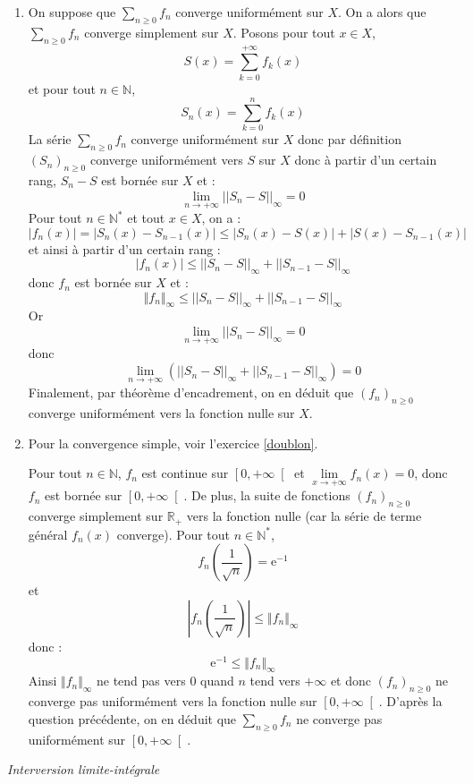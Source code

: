 \documentclass[a4paper,10pt]{report}
\newcommand{\Sum}[2]{\ensuremath{\textstyle{\sum\limits_{#1}^{#2}}}}
\begin{document}
\corr 
\begin{enumerate}
\item On suppose que $\Sum{n\geq 0}{} f_n$ converge uniformément sur $X$. On a alors que $\Sum{n\geq 0}{} f_n$ converge simplement sur $X$. Posons pour tout $x \in X$,
$$S(x)=\displaystyle\sum\limits_{k=0}^{+\infty}f_k(x)$$
et pour tout $n\in\mathbb{N}$, 
$$S_n(x)=\displaystyle\sum\limits_{k=0}^{n}f_k(x)$$
La série $\Sum{n\geq 0}{} f_n$ converge uniformément sur $X$ donc par définition $(S_n)_{n \geq 0}$ converge uniformément vers $S$ sur $X$ donc à partir d'un certain rang, $S_n-S$ est bornée sur $X$ et :
$$\lim\limits_{n\to+\infty}^{}||S_n-S||_{\infty}=0$$ 
Pour tout $n \in \mathbb{N}^*$ et tout $x \in X$, on a :
$$|f_n(x)|=|S_n(x)-S_{n-1}(x)|\leq |S_n(x)-S(x)|+|S(x)-S_{n-1}(x)|$$
et ainsi à partir d'un certain rang :
$$|f_n(x)|\leq ||S_n-S||_{\infty} +||S_{n-1}-S||_{\infty} $$ 
donc $f_n$ est bornée sur $X$ et : 
$$ \Vert f_n \Vert_{\infty} \leq ||S_n-S||_{\infty} +||S_{n-1}-S||_{\infty} $$ 
Or  
$$\lim\limits_{n\to+\infty}^{}||S_n-S||_{\infty}=0$$ 
donc   
$$\lim\limits_{n\to+\infty}^{}\left( ||S_n-S||_{\infty}+||S_{n-1}-S||_{\infty}\right) =0$$
Finalement, par théorème d'encadrement, on en déduit que  $(f_n)_{n \geq 0}$ converge uniformément vers la fonction nulle sur $X$.
\item Pour la convergence simple, voir l'exercice \ref{doublon}.

\medskip

\noindent Pour tout $n\in\mathbb{N}$, $f_n$ est continue sur  $\left[0,+\infty \right[$ et  $\lim\limits_{x\to +\infty}^{}f_n(x)=0$, donc $f_n$ est bornée sur $\left[0,+\infty \right[$. De plus, la suite de fonctions $(f_n)_{n \geq 0}$ converge simplement sur $\mathbb{R}_+$ vers la fonction nulle (car la série de terme général $f_n(x)$ converge). Pour tout $n\in\mathbb{N}^*$, 
$$f_n\left( \dfrac{1}{\sqrt{n}}\right) =\mathrm{e}^{-1}$$
et
$$\left\vert f_n\left( \dfrac{1}{\sqrt{n}}\right) \right\vert \leq \Vert f_n \Vert_{\infty}$$
donc :
$$ \mathrm{e}^{-1} \leq \Vert f_n \Vert_{\infty}$$
Ainsi $\Vert f_n \Vert_{\infty}$ ne tend pas vers $0$ quand $n$ tend vers $+ \infty$ et donc $(f_n)_{n \geq 0}$ ne converge pas uniformément vers la fonction nulle sur $\left[0,+\infty \right[$. D'après la question précédente, on en déduit que $\Sum{n\geq 0}{} f_n$ ne converge pas uniformément sur $\left[0,+\infty \right[$.
\end{enumerate}


\medskip

\begin{center}
\textit{{ {\large Interversion limite-intégrale}}}
\end{center}
\end{document}
